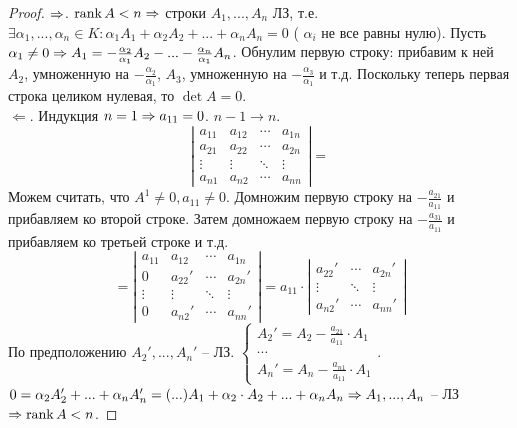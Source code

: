	\begin{proof}
		$\Rightarrow$. $\operatorname{rank} A < n \Rightarrow$ строки $A_1, ..., A_n$ ЛЗ, т.е.
		$\exists \alpha_1, ..., \alpha_n \in K : \alpha_1 A_1 + \alpha_2 A_2 + ... + \alpha_n A_n = 0$ ( $\alpha_i$ не все равны нулю). 
		Пусть $\alpha_1 \neq 0 \Rightarrow A_1 = - \frac{\alpha_2}{\alpha_1} A_2 - ... - \frac{\alpha_n}{\alpha_1} A_n$.
		Обнулим первую строку: прибавим к ней $A_2$, умноженную на $-\frac{\alpha_2}{\alpha_1}$, $A_3$, умноженную на $-\frac{\alpha_3}{\alpha_1}$ и т.д.
		Поскольку теперь первая строка целиком нулевая, то $\det A = 0$. \\

		$\Leftarrow$. Индукция $n = 1 \Rightarrow a_{11} = 0$. $n - 1 \to n$.
		\[\left|\begin{array}{cccc}
		a_{11} & a_{12} & \cdots & a_{1n} \\ 
		a_{21} & a_{22} & \cdots & a_{2n} \\ 
		\vdots & \vdots & \ddots & \vdots \\ 
		a_{n1} & a_{n2} & \cdots & a_{nn}
		\end{array}\right| = \]
		Можем считать, что $A^1 \neq 0, a_{11} \neq 0$. Домножим первую строку на $- \frac{a_{21}}{a_{11}}$ и прибавляем ко второй строке.
		Затем домножаем первую строку на $-\frac{a_{31}}{a_{11}}$ и прибавляем ко третьей строке и т.д.  
		\[= \left|\begin{array}{cccc}
		a_{11} & a_{12} & \cdots & a_{1n} \\ 
		0 & a_{22}' & \cdots & a_{2n}' \\ 
		\vdots & \vdots & \ddots & \vdots \\ 
		0 & a_{n2}' & \cdots & a_{nn}'
		\end{array}\right| = a_{11} \cdot \left|\begin{array}{ccc}
		a_{22}' & \cdots & a_{2n}' \\ 
		\vdots & \ddots & \vdots \\ 
		a_{n2}' & \cdots & a_{nn}'
		\end{array}\right|\]
		По предположению $A_2', ..., A_n'$ -- ЛЗ. $\begin{cases}
			A_2' = A_2 - \frac{a_{21}}{a_{11}} \cdot A_1 \\
			\cdots \\
			A_n' = A_n - \frac{a_{n1}}{a_{11}} \cdot A_1
		\end{cases}$. \\  
		$0 = \alpha_2 A_2' + ... + \alpha_n A_n' = (...) A_1 + \alpha_2 \cdot A_2 + ... + \alpha_n A_n \Rightarrow A_1, ..., A_n$ -- ЛЗ $\Rightarrow \operatorname{rank} A < n$.
	\end{proof}

